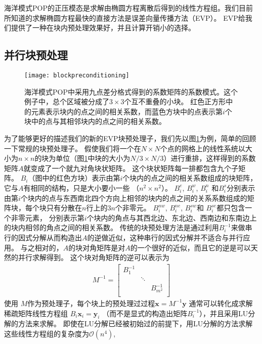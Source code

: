海洋模式POP的正压模态是求解由椭圆方程离散后得到的线性方程组。我们目前所知道的求解椭圆方程最快的直接方法是误差向量传播方法（EVP）\cite{roache1995elliptic}。 
EVP给我们提供了一种在块内预处理效果好，并且计算开销小的选择。




\subsection{并行块预处理} 
\label{precond:EVP:Parallel}
 
\begin{figure}
\centering
\texttt{[image: blockpreconditioning]}
\caption[] {海洋模式POP中采用九点差分格式得到的系数矩阵的系数模式。这个例子中，总个区域被分成了$3\times3$个互不重叠的小块。
红色正方形中的元素表示块内的点之间的相关系数，而蓝色方块中的点表示第$i$个块中的点与其相邻块内的点之间的相关系数。 \label{fig:blockprecond}}
\end{figure}
 
为了能够更好的描述我们的新的EVP块预处理子，我们先以图\ref{fig:blockprecond}为例，简单的回顾一下常规的块预处理子。 
假使我们将一个在$N \times N$个点的网格上的线性系统以大小为$n\times n$的块为单位（图\ref{fig:blockprecond}中块的大小为$N/3\times N/3$）进行重排，这样得到的系数矩阵$A$就变成了一个就九对角块状矩阵。
这个块状矩阵每一排都包含九个子矩阵。 
$B_i$（图中的红色方块）表示由第$i$个块内的点之间的相关系数组成的块矩阵，它与$A$有相同的结构，只是大小要小一些 （$n^2\times n^2$）。 
$B_i^e$, $B_i^w$, $B_i^n$ 和$B_i^s$分别表示由第$i$个块内的点与东西南北四个方向上相邻的块内的点之间的关系系数组成的矩阵块，每个块只有分散在$n$行上的$3n$个非零元。
$B_i^{nw}$, $B_i^{ne}$, $B_i^{sw}$和 $B_i^{se}$都只包含一个非零元素， 分别表示第$i$个块内的角点与其西北边、东北边、西南边和东南边上的块内相邻的角点之间的相关系数。 
传统的块预处理方法是通过利用$B_i^{-1}$来做串行的因式分解从而构造出$A$的逆做近似，这种串行的因式分解并不适合与并行应用。
与之相对的，$A$的块对角矩阵是对$A$的一个很好的近似，而且它的逆是可以天然的并行求解得到。
这个块对角矩阵的逆可以表示为 
\begin{eqnarray*}
M^{-1}=    \left [
        \begin{array}{ccccccc}
        B_1^{-1} &   &  \\
         & \ddots&  \\
        &   &  B_{m^2}^{-1} \\
    \end{array}
    \right ]
\end{eqnarray*}
使用 $M$作为预处理子，每个块上的预处理过过程$\textbf{x}
= M^{-1}\textbf{y}$ 通常可以转化成求解稀疏矩阵线性方程组 $B_i \textbf{x}_i = \textbf{y}_i$
（而不是显式的构造出矩阵$B_i^{-1}$），并且采用LU分解的方法来求解。  
即使在LU分解已经被初始过的前提下，用LU分解的方法求解这些线性方程组的复杂度为$\mathcal{O}(n^4)$,
 


